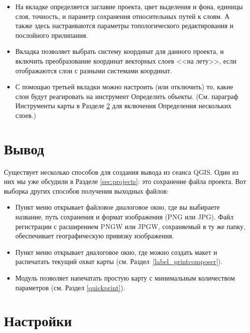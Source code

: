 \begin{itemize}
\item На вкладке  определяется заглавие проекта, цвет выделения и фона, единицы слоя, точность, и параметр сохранения относительных путей к слоям. А также здесь настраиваются параметры топологического редактирования и послойного прилипания.
\item Вкладка  позволяет выбрать систему координат для данного проекта, и включить преобразование координат векторных слоев <<на лету>>, если отображаются слои с разными системами координат.
\item С помощью третьей вкладки  можно настроить (или отключить) то, какие слои будут реагировать на инструмент Определить объекты. (См. параграф Инструменты карты в Разделе
\ref{subsec:gui_options} для включения Определения нескольких слоев.)
\end{itemize}

\section{Вывод}\label{sec:output}

Существует несколько способов для создания вывода из сеанса QGIS. Один из них мы уже обсудили в Разделе \ref{sec:projects}: это сохранение файла проекта. Вот выборка других способов получения выходных файлов:

\begin{itemize}
\item Пункт меню  открывает файловое диалоговое окно, где вы выбираете название, путь сохранения и формат изображения (PNG или JPG).
Файл регистрации с расширением PNGW или JPGW, сохраняемый в ту же папку, обеспечивает географическую привязку изображения.
\item Пункт меню  открывает диалоговое окно, где можно создать макет и распечатать текущий охват карты (см. Раздел~\ref{label_printcomposer}).
\item Модуль  позволяет напечатать простую карту с минимальным количеством параметров (см. Раздел \ref{quickprint}).
\end{itemize}

\section{Настройки}\label{subsec:gui_options}

